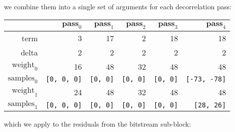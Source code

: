 \par
\noindent
we combine them into a single set of arguments for each decorrelation pass:
\begin{table}[h]
{
  \begin{tabular}{|r|r|r|r|r|r|}
    \hline
    & $\textbf{pass}_0$ & $\textbf{pass}_1$ & $\textbf{pass}_2$ &
    $\textbf{pass}_3$ & $\textbf{pass}_4$ \\
    \hline
    term & 3 & 17 & 2 & 18 & 18 \\
    delta & 2 & 2 & 2 & 2 & 2 \\
    $\text{weight}_0$ & 16 & 48 & 32 & 48 & 48 \\
    $\text{samples}_{0}$ & \texttt{[0, 0, 0]} & \texttt{[0, 0]} &
    \texttt{[0, 0]} & \texttt{[0, 0]} & \texttt{[-73, -78]} \\
    $\text{weight}_1$ & 24 & 48 & 32 & 48 & 48 \\
    $\text{samples}_{1}$ & \texttt{[0, 0, 0]} & \texttt{[0, 0]} &
    \texttt{[0, 0]} & \texttt{[0, 0]} & \texttt{[28, 26]} \\
    \hline
  \end{tabular}
}
\end{table}
\par
\noindent
which we apply to the residuals from the bitstream sub-block:
\par
\noindent
